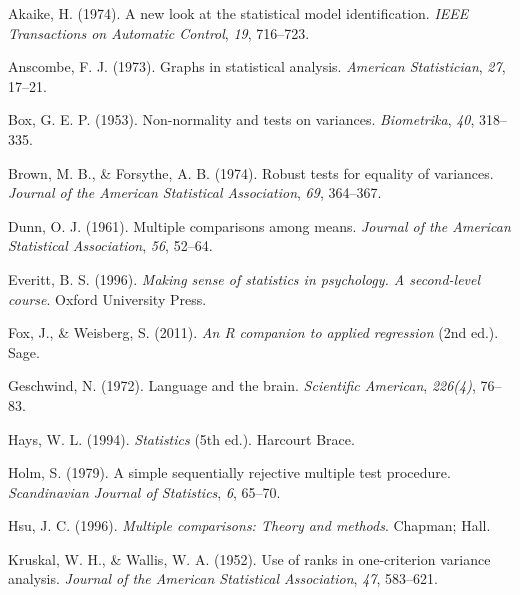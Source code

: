 \documentclass[
  a4paper,
]{book}
\newlength{\cslhangindent}
\newlength{\cslentryspacingunit} %
\newenvironment{CSLReferences}[2] %
 {%
  \setlength{\parindent}{0pt}
  \ifodd #1
  \let\oldpar\par
  \def\par{\hangindent=\cslhangindent\oldpar}
  \fi
  \setlength{\parskip}{#2\cslentryspacingunit}
 }%
 {}
\begin{document}
\hypertarget{refs}{}
\begin{CSLReferences}{1}{0}
\leavevmode{}%
Akaike, H. (1974). A new look at the statistical model identification.
\emph{IEEE Transactions on Automatic Control}, \emph{19}, 716--723.

\leavevmode{}%
Anscombe, F. J. (1973). Graphs in statistical analysis. \emph{American
Statistician}, \emph{27}, 17--21.

\leavevmode{}%
Box, G. E. P. (1953). Non-normality and tests on variances.
\emph{Biometrika}, \emph{40}, 318--335.

\leavevmode{}%
Brown, M. B., \& Forsythe, A. B. (1974). Robust tests for equality of
variances. \emph{Journal of the American Statistical Association},
\emph{69}, 364--367.

\leavevmode{}%
Dunn, O. J. (1961). Multiple comparisons among means. \emph{Journal of
the American Statistical Association}, \emph{56}, 52--64.

\leavevmode{}%
Everitt, B. S. (1996). \emph{Making sense of statistics in psychology. A
second-level course}. Oxford University Press.

\leavevmode{}%
Fox, J., \& Weisberg, S. (2011). \emph{An {R} companion to applied
regression} (2nd ed.). Sage.

\leavevmode{}%
Geschwind, N. (1972). Language and the brain. \emph{Scientific
American}, \emph{226(4)}, 76--83.

\leavevmode{}%
Hays, W. L. (1994). \emph{Statistics} (5th ed.). Harcourt Brace.

\leavevmode{}%
Holm, S. (1979). A simple sequentially rejective multiple test
procedure. \emph{Scandinavian Journal of Statistics}, \emph{6}, 65--70.

\leavevmode{}%
Hsu, J. C. (1996). \emph{Multiple comparisons: Theory and methods}.
Chapman; Hall.

\leavevmode{}%
Kruskal, W. H., \& Wallis, W. A. (1952). Use of ranks in one-criterion
variance analysis. \emph{Journal of the American Statistical
Association}, \emph{47}, 583--621.


\end{CSLReferences}
\end{document}
